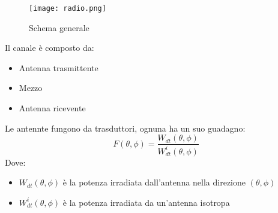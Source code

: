 \documentclass{article}
\begin{document}
\begin{figure}[ht]
    \centering
    \texttt{[image: radio.png]}
    \caption{Schema generale}
\end{figure}

\noindent Il canale è composto da:
\begin{itemize}
    \item Antenna trasmittente
    \item Mezzo
    \item Antenna ricevente\newline
\end{itemize}

\noindent Le antennte fungono da trasduttori, ognuna ha un suo guadagno:
$$F(\theta,\phi)=\frac{W_{dt}(\theta,\phi)}{W_{dt}^i(\theta,\phi)}$$
\noindent Dove:
\begin{itemize}
    \item $W_{dt}(\theta,\phi)$ è la potenza irradiata dall'antenna nella direzione $(\theta,\phi)$
    \item $W_{dt}^i(\theta,\phi)$ è la potenza irradiata da un'antenna isotropa\newline
\end{itemize}
\end{document}
